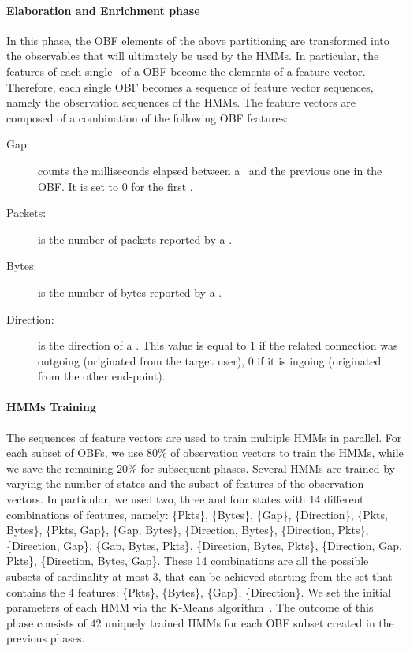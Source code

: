 \documentclass[10pt,conference,compsocconf,letterpaper]{IEEEtran}
\begin{document}
\paragraph{Elaboration and Enrichment phase}
In this phase, the OBF elements of the above partitioning are
transformed into the observables that will ultimately be used by the HMMs. In
particular, the features of each single \nfr\ of a OBF become the
elements of a feature vector. Therefore, each single OBF becomes a
sequence of feature vector sequences, namely the observation sequences
of the HMMs. The feature vectors are composed of a combination
of the following OBF features:
\begin{description}
\item[Gap:] counts the milliseconds elapsed between a \nfr\ and the
  previous one in the OBF. It is set to $0$ for the first \nfr.
\item[Packets:] is the number of packets reported by a \nfr.
\item[Bytes:] is the number of bytes reported by a \nfr.
\item[Direction:] is the direction of a \nfr. This value is equal to
  $1$ if the related connection was outgoing (originated from the
  target user), 0 if it is ingoing (originated from the other
  end-point).
\end{description}
\paragraph{HMMs Training}
The sequences of feature vectors are  used to train multiple
HMMs in parallel. For each subset of OBFs, we use $80\%$ of
observation vectors to train the HMMs, while we save the remaining $20\%$ for
subsequent phases. Several HMMs are trained by varying the number of 
states and the subset of features of the observation vectors. 
In particular, we used two, three and four states with 14
different combinations of features, namely: \{Pkts\}, \{Bytes\}, \{Gap\},
\{Direction\}, \{Pkts, Bytes\}, \{Pkts, Gap\}, \{Gap, Bytes\},
\{Direction, Bytes\}, \{Direction, Pkts\}, \{Direction, Gap\}, \{Gap,
Bytes, Pkts\}, \{Direction, Bytes, Pkts\}, \{Direction, Gap, Pkts\},
\{Direction, Bytes, Gap\}. These 14 combinations are all the possible 
subsets of cardinality at most 3, that can be achieved starting from 
the set that contains the 4 features:
\{Pkts\}, \{Bytes\}, \{Gap\}, \{Direction\}. 
We set the initial parameters of each HMM
via the K-Means algorithm~\cite{Kanungo2002}. The outcome of this phase consists of $42$ uniquely trained HMMs
for each OBF subset created in the previous phases.
\end{document}
